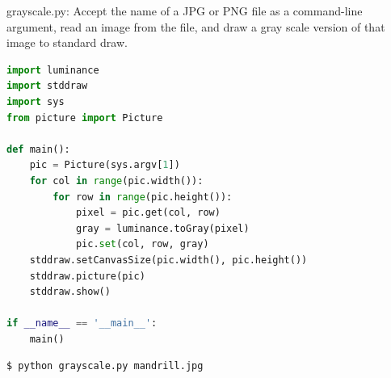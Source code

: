 \documentclass[8pt,a4paper,compress]{beamer}
\begin{document}
\begin{frame}[fragile]
\pause

\begin{framed}
\tiny grayscale.py: Accept the name of a JPG or PNG file as a command-line argument, read an image from the file, and draw a gray scale version of that image to standard draw.
\end{framed}

\begin{lstlisting}[language=Python]
import luminance
import stddraw
import sys
from picture import Picture

def main():
    pic = Picture(sys.argv[1])
    for col in range(pic.width()):
        for row in range(pic.height()):
            pixel = pic.get(col, row)
            gray = luminance.toGray(pixel)
            pic.set(col, row, gray)
    stddraw.setCanvasSize(pic.width(), pic.height())
    stddraw.picture(pic)
    stddraw.show()

if __name__ == '__main__':
    main()
\end{lstlisting}

\pause

\begin{minipage}{200pt}
\begin{lstlisting}[language={}]
$ python grayscale.py mandrill.jpg
\end{lstlisting}
\end{minipage}%
\hfill
\begin{minipage}{100pt}
\begin{center}
\end{center}
\end{minipage}
\end{frame}
\end{document}
